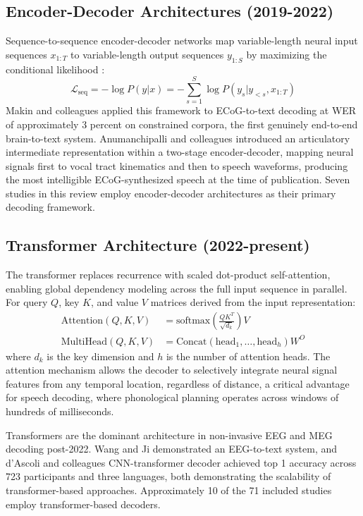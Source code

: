 \subsection{Encoder-Decoder Architectures (2019-2022)}

Sequence-to-sequence encoder-decoder networks map variable-length neural input sequences $x_{1:T}$ to variable-length output sequences $y_{1:S}$ by maximizing the conditional likelihood \cite{Sutskever2014}:
\begin{equation}
\mathcal{L}_{\text{seq}} = -\log P(y|x) = -\sum_{s=1}^{S} \log P(y_s | y_{<s}, x_{1:T})
\end{equation}
Makin and colleagues \cite{Makin2020} applied this framework to ECoG-to-text decoding at WER of approximately 3 percent on constrained corpora, the first genuinely end-to-end brain-to-text system. Anumanchipalli and colleagues \cite{Anumanchipalli2019} introduced an articulatory intermediate representation within a two-stage encoder-decoder, mapping neural signals first to vocal tract kinematics and then to speech waveforms, producing the most intelligible ECoG-synthesized speech at the time of publication. Seven studies in this review employ encoder-decoder architectures as their primary decoding framework.

\subsection{Transformer Architecture (2022-present)}

The transformer \cite{Vaswani2017} replaces recurrence with scaled dot-product self-attention, enabling global dependency modeling across the full input sequence in parallel. For query $Q$, key $K$, and value $V$ matrices derived from the input representation:
\begin{align}
\text{Attention}(Q, K, V) &= \text{softmax}\left(\frac{QK^T}{\sqrt{d_k}}\right) V \\
\text{MultiHead}(Q, K, V) &= \text{Concat}(\text{head}_1, \ldots, \text{head}_h) W^O
\end{align}
where $d_k$ is the key dimension and $h$ is the number of attention heads. The attention mechanism allows the decoder to selectively integrate neural signal features from any temporal location, regardless of distance, a critical advantage for speech decoding, where phonological planning operates across windows of hundreds of milliseconds.

Transformers are the dominant architecture in non-invasive EEG and MEG decoding post-2022. Wang and Ji \cite{Wang2022} demonstrated an EEG-to-text system, and d'Ascoli and colleagues \cite{dAscoli2025} CNN-transformer decoder achieved top 1 accuracy across 723 participants and three languages, both demonstrating the scalability of transformer-based approaches. Approximately 10 of the 71 included studies employ transformer-based decoders.

